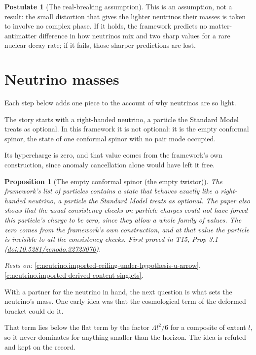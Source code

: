 \documentclass[11pt]{article}
\newtheorem{proposition}[theorem]{Proposition}
\theoremstyle{definition}
\newtheorem{postulate}[theorem]{Postulate}
\theoremstyle{plain}
\begin{document}
\begin{postulate}[The real-breaking assumption]\label{c:neutrino.real-breaking-assumption}
This is an assumption, not a result: the small distortion that gives the lighter neutrinos their masses is taken to involve no complex phase. If it holds, the framework predicts no matter-antimatter difference in how neutrinos mix and two sharp values for a rare nuclear decay rate; if it fails, those sharper predictions are lost.
\end{postulate}

\section{Neutrino masses}

Each step below adds one piece to the account of why neutrinos are so light.

The story starts with a right-handed neutrino, a particle the Standard Model treats as optional. In this framework it is not optional: it is the empty conformal spinor, the state of one conformal spinor with no pair mode occupied.

Its hypercharge is zero, and that value comes from the framework's own construction, since anomaly cancellation alone would have left it free.

\begin{proposition}[The empty conformal spinor (the empty twistor)]\label{c:neutrino.empty-twistor}
The framework's list of particles contains a state that behaves exactly like a right-handed neutrino, a particle the Standard Model treats as optional. The paper also shows that the usual consistency checks on particle charges could not have forced this particle's charge to be zero, since they allow a whole family of values. The zero comes from the framework's own construction, and at that value the particle is invisible to all the consistency checks.
\emph{First proved in} T15, Prop 3.1 (\href{https://doi.org/10.5281/zenodo.22723070}{doi:10.5281/zenodo.22723070}).
\end{proposition}
\noindent\emph{Rests on:} \ref{c:neutrino.imported-ceiling-under-hypothesis-u-arrow}, \ref{c:neutrino.imported-derived-content-singlets}.

With a partner for the neutrino in hand, the next question is what sets the neutrino's mass. One early idea was that the cosmological term of the deformed bracket could do it.

That term lies below the flat term by the factor $\Lambda l^{2}/6$ for a composite of extent $l$, so it never dominates for anything smaller than the horizon. The idea is refuted and kept on the record.
\end{document}
